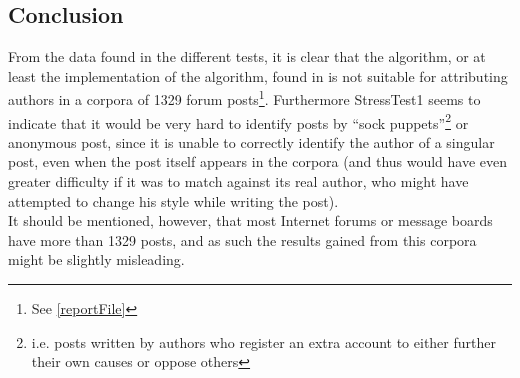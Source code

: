 \subsection{Conclusion}
From the data found in the different tests, it is clear that the algorithm, or at least the implementation of the algorithm, found in \cite{nr4} is not suitable for attributing authors in a corpora of 1329 forum posts\footnote{See \ref{reportFile}}. Furthermore StressTest1 seems to indicate that it would be very hard to identify posts by ``sock puppets''\footnote{i.e. posts written by authors who register an extra account to either further their own causes or oppose others} or anonymous post, since it is unable to correctly identify the author of a singular post, even when the post itself appears in the corpora (and thus would have even greater difficulty if it was to match against its real author, who might have attempted to change his style while writing the post).\\ 

It should be mentioned, however, that most Internet forums or message boards have more than 1329 posts, and as such the results gained from this corpora might be slightly misleading. 
